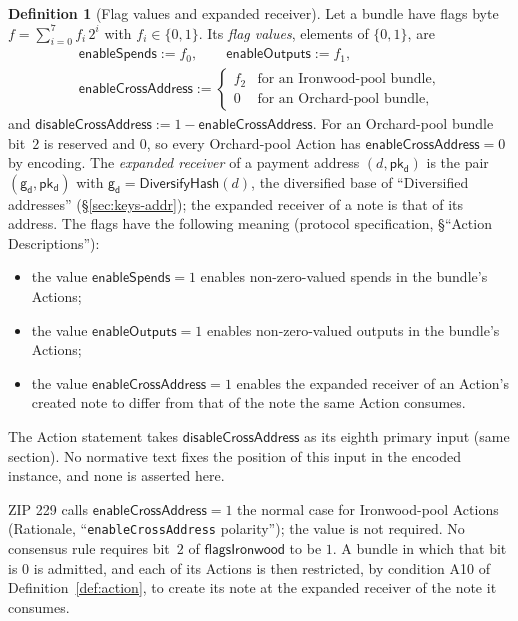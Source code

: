 \documentclass[11pt,a4paper]{article}
\theoremstyle{definition}
\newtheorem{definition}[theorem]{Definition}
\newcommand{\pkd}{\ensuremath{\mathsf{pk_d}}}
\newcommand{\gd}{\ensuremath{\mathsf{g_d}}}
\begin{document}
\begin{definition}[Flag values and expanded receiver]
Let a bundle have flags byte $f = \sum_{i=0}^{7} f_i\, 2^i$ with
$f_i \in \{0, 1\}$. Its \emph{flag values}, elements of $\{0, 1\}$, are
\begin{gather*}
  \mathsf{enableSpends} := f_0, \qquad
  \mathsf{enableOutputs} := f_1, \\
  \mathsf{enableCrossAddress} :=
  \begin{cases}
    f_2 & \text{for an Ironwood-pool bundle}, \\
    0 & \text{for an Orchard-pool bundle},
  \end{cases}
\end{gather*}
and $\mathsf{disableCrossAddress} := 1 - \mathsf{enableCrossAddress}$. For an
Orchard-pool bundle bit~$2$ is reserved and $0$, so every Orchard-pool Action
has $\mathsf{enableCrossAddress} = 0$ by encoding. The \emph{expanded
receiver} of a payment address $(d, \pkd)$ is the pair $(\gd, \pkd)$ with
$\gd = \mathsf{DiversifyHash}(d)$, the diversified base of ``Diversified
addresses'' (\S\ref{sec:keys-addr}); the expanded receiver of a note is that
of its address. The flags have the following meaning (protocol
specification, \S``Action Descriptions''):
\begin{itemize}
\item the value $\mathsf{enableSpends} = 1$ enables non-zero-valued spends in
  the bundle's Actions;
\item the value $\mathsf{enableOutputs} = 1$ enables non-zero-valued outputs
  in the bundle's Actions;
\item the value $\mathsf{enableCrossAddress} = 1$ enables the expanded
  receiver of an Action's created note to differ from that of the note the
  same Action consumes.
\end{itemize}
The Action statement takes $\mathsf{disableCrossAddress}$ as its eighth
primary input (same section). No normative text fixes the position of this
input in the encoded instance, and none is asserted here.
\end{definition}

ZIP 229 calls $\mathsf{enableCrossAddress} = 1$ the normal case for
Ironwood-pool Actions (Rationale, ``\texttt{enableCrossAddress} polarity'');
the value is not required. No consensus rule requires bit~$2$ of
$\mathsf{flagsIronwood}$ to be $1$. A bundle in which that bit is $0$ is
admitted, and each of its Actions is then restricted, by condition A10 of
Definition~\ref{def:action}, to create its note at the expanded receiver of
the note it consumes.
\end{document}
